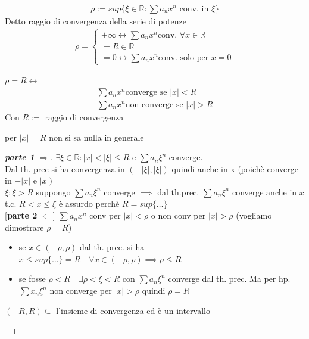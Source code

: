 \documentclass[a4paper, oneside]{article}
\begin{document}
\begin{definition}
  \begin{gather*}
    \boxed{\rho := sup \{\xi \in \mathbb{R} : \sum a_n  x^n \text{ conv. in } \xi \}}
  \end{gather*}
  Detto raggio di convergenza della serie di potenze
  \begin{gather*}
    \rho = \begin{cases}
      +\infty \leftrightarrow \sum a_n x^n \text{conv. } \forall x \in \mathbb{R}\\
      = R \in \mathbb{R} \\
      = 0 \leftrightarrow \sum a_n x^n \text{conv. solo per } x=0
    \end{cases}
  \end{gather*}
\end{definition}
\begin{theorem}
  $\rho = R \leftrightarrow $\\
  \begin{gather*}
    \sum a_n x^n \text{converge se } |x| < R \\
    \sum a_n x^n \text{non converge se } |x| > R
  \end{gather*} 
  Con $R := $ raggio di convergenza
\end{theorem}
\begin{observation}
  per $|x| = R$ non si sa nulla in generale
\end{observation}
\begin{proof}
  [\textbf{parte 1} $\Rightarrow$]
  $\exists \xi \in \mathbb{R}: |x| < |\xi| \leq R$ e $\sum a_n \xi^n $ converge.\\
  Dal th. prec si ha convergenza in $(-|\xi|, |\xi|)$ quindi anche in x (poichè converge in $-|x|$ e  $|x|)$\\
   $\xi: \xi > R$
  suppongo $\sum a_n \xi^n $ converge $\implies$ dal th.prec. $\sum a_n \xi^n$ converge anche in $x$ t.c. $R < x \leq \xi$ è assurdo perchè $R = sup \{\dots\}$\\

  [\textbf{parte 2} $\Leftarrow$]
  $\sum a_n x^n $ conv per $|x| < \rho$ o non conv per $|x| > \rho$ (vogliamo dimostrare $\rho = R$)\\
  \begin{itemize}
    \item se $x \in (-\rho, \rho)$ dal th. prec. si ha $x \leq sup \{\dots\} = R \quad \forall x \in (-\rho,\rho) \implies \rho \leq R$
    \item se fosse $\rho < R \quad \exists \rho < \xi < R$ con $\sum a_n \xi^n$ converge dal th. prec.
    Ma per hp. $\sum x_n \xi^n$ non converge per $|x| > \rho$ quindi $\rho = R$
  \end{itemize}
  \begin{observation}
    $(-R,R) \subseteq$ l'insieme di convergenza ed è un intervallo
  \end{observation}
\end{proof}
\end{document}
